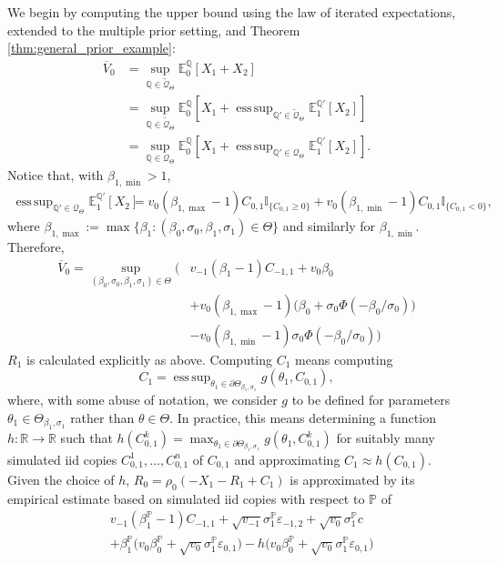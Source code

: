 \documentclass[11pt,a4paper]{article}
\newcommand{\E}{\mathbb{E}}
\DeclareMathOperator*{\esssup}{ess\,sup}
\renewcommand{\P}{\mathbb{P}}
\newcommand{\Q}{\mathbb{Q}}
\newcommand{\R}{\mathbb{R}}
\newcommand{\calQ}{\mathcal{Q}}
\newcommand{\indic}{\mathbb{I}}
\begin{document}
We begin by computing the upper bound using the law of iterated expectations, extended to the multiple prior setting, and Theorem \ref{thm:general_prior_example}: 
\begin{align*}
\overline{V}_0&=\sup_{\Q\in\widetilde{\calQ}_{\Theta}}\E^{\Q}_0[X_1+X_2]\\
&=\sup_{\Q\in\widetilde{\calQ}_{\Theta}}\E^{\Q}_0[X_1+\esssup_{\Q'\in\widetilde{\calQ}_{\Theta}}\E^{\Q'}_1[X_2]]\\
&=\sup_{\Q\in\calQ_{\Theta}}\E^{\Q}_0[X_1+\esssup_{\Q'\in\calQ_{\Theta}}\E^{\Q'}_1[X_2]].
\end{align*}
Notice that, with $\beta_{1,\min}>1$,  
\begin{align*}
\esssup_{\Q'\in\calQ_{\Theta}}\E^{\Q'}_1[X_2]
&=v_0(\beta_{1,\max}-1)C_{0,1}\indic_{\{C_{0,1}\geq 0\}}+v_0(\beta_{1,\min}-1)C_{0,1}\indic_{\{C_{0,1}<0\}},
\end{align*}
where $\beta_{1,\max}:=\max\{\beta_1:(\beta_0,\sigma_0,\beta_1,\sigma_1)\in \Theta\}$ and similarly for $\beta_{1,\min}$. 
Therefore, 
\begin{align*}
\overline{V}_0
=\sup_{(\beta_0,\sigma_0,\beta_1,\sigma_1)\in \Theta}\Big(&v_{-1}(\beta_1-1)C_{-1,1}+v_0\beta_0\\
&+v_0(\beta_{1,\max}-1)\big(\beta_0+\sigma_0\Phi(-\beta_0/\sigma_0)\big)\\
&-v_0(\beta_{1,\min}-1)\sigma_0\Phi(-\beta_0/\sigma_0)\Big)
\end{align*}
$R_1$ is calculated explicitly as above.   
Computing $C_1$ means computing 
$$
C_1=\esssup_{\theta_1\in \partial \Theta_{\beta_1,\sigma_1}}g(\theta_1,C_{0,1}),
$$
where, with some abuse of notation, we consider $g$ to be defined for parameters $\theta_1\in \Theta_{\beta_1,\sigma_1}$ 
rather than $\theta\in \Theta$. In practice, this means determining a function $h:\R\to\R$ such that 
$h(C^k_{0,1})=\max_{\theta_1\in \partial \Theta_{\beta_1,\sigma_1}}g(\theta_1,C^k_{0,1})$ for suitably many simulated iid copies $C^1_{0,1},\dots,C^n_{0,1}$ of $C_{0,1}$ and approximating $C_1\approx h(C_{0,1})$. 
Given the choice of $h$, $R_0=\rho_0(-X_1-R_1+C_1)$ is approximated by its empirical estimate based on simulated iid copies with respect to $\P$ of 
\begin{align*}
&v_{-1}(\beta_1^{\P}-1)C_{-1,1}+\sqrt{v_{-1}}\sigma_1^{\P}\varepsilon_{-1,2}+\sqrt{v_0}\sigma_1^{\P}c\\
&+\beta_1^{\P}\bigg(v_0\beta_0^{\P}+\sqrt{v_0}\sigma_1^{\P}\varepsilon_{0,1}\bigg)
-h\bigg(v_0\beta_0^{\P}+\sqrt{v_0}\sigma_1^{\P}\varepsilon_{0,1}\bigg)
\end{align*}
\end{document}
